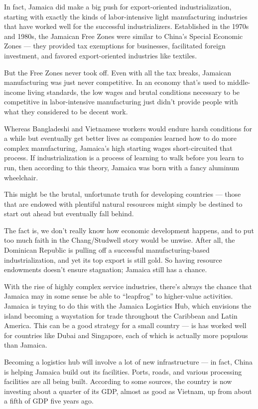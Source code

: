 \documentclass[
]{book}
\begin{document}
In fact, Jamaica did make a big push for export-oriented industrialization, starting with exactly the kinds of labor-intensive light manufacturing industries that have worked well for the successful industrializers. Established in the 1970s and 1980s, the Jamaican Free Zones were similar to China's Special Economic Zones --- they provided tax exemptions for businesses, facilitated foreign investment, and favored export-oriented industries like textiles.

But the Free Zones never took off. Even with all the tax breaks, Jamaican manufacturing was just never competitive. In an economy that's used to middle-income living standards, the low wages and brutal conditions necessary to be competitive in labor-intensive manufacturing just didn't provide people with what they considered to be decent work.

Whereas Bangladeshi and Vietnamese workers would endure harsh conditions for a while but eventually get better lives as companies learned how to do more complex manufacturing, Jamaica's high starting wages short-circuited that process. If industrialization is a process of learning to walk before you learn to run, then according to this theory, Jamaica was born with a fancy aluminum wheelchair.

This might be the brutal, unfortunate truth for developing countries --- those that are endowed with plentiful natural resources might simply be destined to start out ahead but eventually fall behind.

The fact is, we don't really know how economic development happens, and to put too much faith in the Chang/Studwell story would be unwise. After all, the Dominican Republic is pulling off a successful manufacturing-based industrialization, and yet its top export is still gold. So having resource endowments doesn't ensure stagnation; Jamaica still has a chance.

With the rise of highly complex service industries, there's always the chance that Jamaica may in some sense be able to ``leapfrog'' to higher-value activities. Jamaica is trying to do this with the Jamaica Logistics Hub, which envisions the island becoming a waystation for trade throughout the Caribbean and Latin America. This can be a good strategy for a small country --- is has worked well for countries like Dubai and Singapore, each of which is actually more populous than Jamaica.

Becoming a logistics hub will involve a lot of new infrastructure --- in fact, China is helping Jamaica build out its facilities. Ports, roads, and various processing facilities are all being built. According to some sources, the country is now investing about a quarter of its GDP, almost as good as Vietnam, up from about a fifth of GDP five years ago.
\end{document}
